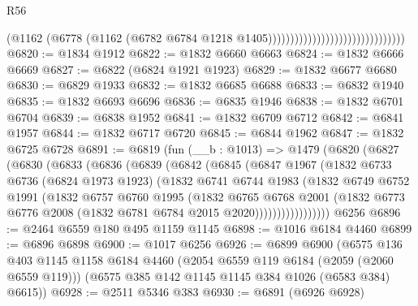 \begin{lexlean}{R56}
\begin{coremodule}
                                                          (@1162
                                                            (@6778
                                                              (@1162
                                                                (@6782
                                                                  @6784
                                                                  @1218
                                                                  @1405)))))))))))))))))))))))))))))))
@6820 := @1834 @1912
@6822 := @1832 @6660 @6663
@6824 := @1832 @6666 @6669
@6827 := @6822 (@6824 @1921 @1923)
@6829 := @1832 @6677 @6680
@6830 := @6829 @1933
@6832 := @1832 @6685 @6688
@6833 := @6832 @1940
@6835 := @1832 @6693 @6696
@6836 := @6835 @1946
@6838 := @1832 @6701 @6704
@6839 := @6838 @1952
@6841 := @1832 @6709 @6712
@6842 := @6841 @1957
@6844 := @1832 @6717 @6720
@6845 := @6844 @1962
@6847 := @1832 @6725 @6728
@6891 := @6819
    (fun (__b : @1013) =>
    @1479
      (@6820
        (@6827
          (@6830
            (@6833
              (@6836
                (@6839
                  (@6842
                    (@6845
                      (@6847
                        @1967
                        (@1832
                          @6733
                          @6736
                          (@6824 @1973 @1923)
                          (@1832
                            @6741
                            @6744
                            @1983
                            (@1832
                              @6749
                              @6752
                              @1991
                              (@1832
                                @6757
                                @6760
                                @1995
                                (@1832
                                  @6765
                                  @6768
                                  @2001
                                  (@1832
                                    @6773
                                    @6776
                                    @2008
                                    (@1832 @6781 @6784 @2015 @2020)))))))))))))))))
    @6256
@6896 := @2464 @6559 @180 @495 @1159 @1145
@6898 := @1016 @6184 @4460
@6899 := @6896 @6898
@6900 := @1017 @6256
@6926 := @6899
    @6900
    (@6575
      @136
      @403
      @1145
      @1158
      @6184
      @4460
      (@2054 @6559 @119 @6184 (@2059 (@2060 @6559 @119)))
      (@6575 @385 @142 @1145 @1145 @384 @1026 (@6583 @384) @6615))
@6928 := @2511 @5346 @383
@6930 := @6891 (@6926 @6928)

\end{coremodule}
\end{lexlean}
